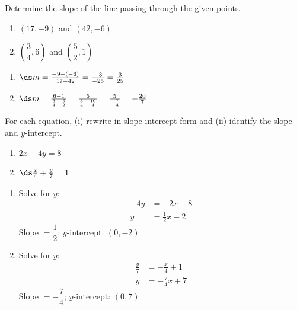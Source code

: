 \documentclass{ximera}
\begin{document}
\begin{problem}
Determine the slope of the line passing through the given points.
\begin{enumerate}
  \item[(a)] $(17,-9)$ and $(42,-6)$
  \medskip
  \item[(b)] $\left(\dfrac{3}{4},6\right)$ and $\left(\dfrac{5}{2},1\right)$
\end{enumerate}

\begin{solution}
\begin{enumerate}
  \item[(a)] $\ds m = \frac{-9-(-6)}{17-42} = \frac{-3}{-25} = \frac{3}{25}$

  \item[(b)] $\ds m = \frac{6-1}{\frac{3}{4}-\frac{5}{2}} = \frac{5}{\frac{3}{4}-\frac{10}{4}} = \frac{5}{-\frac{7}{4}} = -\frac{20}{7}$
\end{enumerate}
\end{solution}
\end{problem}


\begin{problem}
For each equation, (i) rewrite in slope-intercept form and (ii) identify the slope and $y$-intercept.
\begin{enumerate}
  \item[(a)] $2x - 4y = 8$
  \medskip
  \item[(b)] $\ds\frac{x}{4} + \frac{y}{7} = 1$
\end{enumerate}

\begin{solution}
\begin{enumerate}
  \item[(a)] Solve for $y$:
  \begin{align*}
    -4y &= -2x + 8\\
    y &= \frac{1}{2}x - 2
  \end{align*}
  Slope $= \dfrac{1}{2}$; $y$-intercept: $(0,-2)$

  \item[(b)] Solve for $y$:
  \begin{align*}
    \frac{y}{7} &= -\frac{x}{4} + 1\\
    y &= -\frac{7}{4}x + 7
  \end{align*}
  Slope $= -\dfrac{7}{4}$; $y$-intercept: $(0,7)$
\end{enumerate}
\end{solution}
\end{problem}
\end{document}
